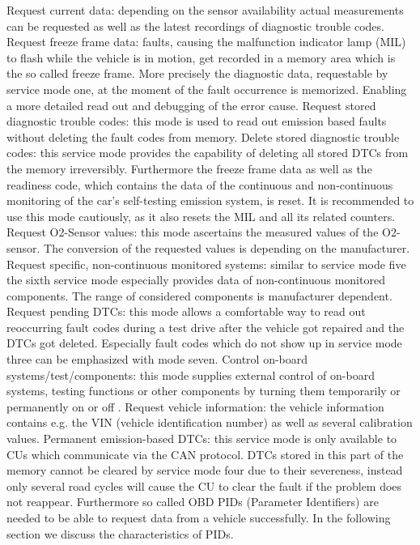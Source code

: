 Request current data: depending on the sensor availability actual measurements can be requested as well as the latest recordings of diagnostic trouble codes.
Request freeze frame data: faults, causing the malfunction indicator lamp (MIL) to flash while the vehicle is in motion, get recorded in a memory area which is the so called freeze frame. More precisely the diagnostic data, requestable by service mode one, at the moment of the fault occurrence is memorized. Enabling a more detailed read out and debugging of the error cause.
Request stored diagnostic trouble codes: this mode is used to read out emission based faults without deleting the fault codes from memory.
Delete stored diagnostic trouble codes: this service mode provides the capability of deleting all stored DTCs from the memory irreversibly. Furthermore the freeze frame data as well as the readiness code, which contains the data of the continuous and non-continuous monitoring of the car’s self-testing emission system, is reset. It is recommended to use this mode cautiously, as it also resets the MIL and all its related counters.
Request O2-Sensor values: this mode ascertains the measured values of the O2-sensor. The conversion of the requested values is depending on the manufacturer.
Request specific, non-continuous monitored systems: similar to service mode five the sixth service mode especially provides data of non-continuous monitored components. The range of considered components is  manufacturer dependent.
Request pending DTCs: this mode allows a comfortable way to read out reoccurring fault codes during a test drive after the vehicle got repaired and the DTCs got deleted. Especially fault codes which do not show up in service mode three can be emphasized with mode seven.
Control on-board systems/test/components: this mode supplies external control of on-board systems, testing functions or other components by turning them temporarily or permanently  on or off .
Request vehicle information: the vehicle information contains e.g. the VIN (vehicle identification number) as well as several calibration values.
Permanent emission-based DTCs: this service mode is only available to CUs which communicate via the CAN protocol. DTCs stored in this part of the memory cannot be cleared by service mode four due to their severeness, instead only several road cycles will cause the CU to clear the fault if the problem does not reappear.
Furthermore so called OBD PIDs (Parameter Identifiers) are needed to be able to request data from a vehicle successfully. In the following section we discuss the characteristics of PIDs.
